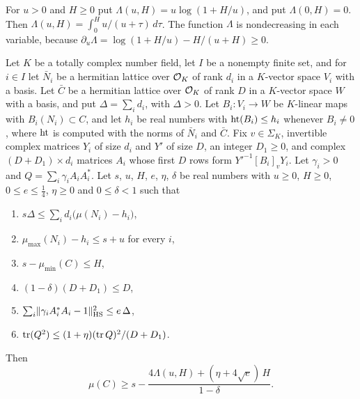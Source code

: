 For $u>0$ and $H\ge0$ put $\Lambda(u,H)=u\log(1+H/u)$, and put $\Lambda(0,H)=0$. Then $\Lambda(u,H)=\int_0^Hu/(u+\tau)\,d\tau$. The function $\Lambda$ is nondecreasing in each variable, because $\partial_u\Lambda=\log(1+H/u)-H/(u+H)\ge0$.

\begin{theorem}\label{r3:frame}
Let $K$ be a totally complex number field, let $I$ be a nonempty finite set, and for $i\in I$ let $\bar N_i$ be a hermitian lattice over $\mathcal O_K$ of rank $d_i$ in a $K$-vector space $V_i$ with a basis. Let $\bar C$ be a hermitian lattice over $\mathcal O_K$ of rank $D$ in a $K$-vector space $W$ with a basis, and put $\Delta=\sum_id_i$, with $\Delta>0$. Let $B_i\colon V_i\to W$ be $K$-linear maps with $B_i(N_i)\subset C$, and let $h_i$ be real numbers with $\operatorname{ht}(B_i)\le h_i$ whenever $B_i\ne0$, where $\operatorname{ht}$ is computed with the norms of $\bar N_i$ and $\bar C$. Fix $v\in\Sigma_K$, invertible complex matrices $Y_i$ of size $d_i$ and $Y'$ of size $D$, an integer $D_1\ge0$, and complex $(D+D_1)\times d_i$ matrices $A_i$ whose first $D$ rows form $Y'^{-1}[B_i]_vY_i$. Let $\gamma_i>0$ and $Q=\sum_i\gamma_iA_iA_i^*$. Let $s$, $u$, $H$, $e$, $\eta$, $\delta$ be real numbers with $u\ge0$, $H\ge0$, $0\le e\le\frac14$, $\eta\ge0$ and $0\le\delta<1$ such that
\begin{enumerate}
\item[(i)] $s\Delta\le\sum_id_i\big(\mu(N_i)-h_i\big)$,
\item[(ii)] $\mu_{\max}(N_i)-h_i\le s+u$ for every $i$,
\item[(iii)] $s-\mu_{\min}(C)\le H$,
\item[(iv)] $(1-\delta)(D+D_1)\le D$,
\item[(v)] $\sum_i\lVert\gamma_iA_i^*A_i-1\rVert_{\mathrm{HS}}^2\le e\,\Delta$,
\item[(vi)] $\operatorname{tr}(Q^2)\le(1+\eta)(\operatorname{tr} Q)^2/(D+D_1)$.
\end{enumerate}
Then
\[
\mu(C)\ge s-\frac{4\Lambda(u,H)+(\eta+4\sqrt e)\,H}{1-\delta}.
\]
\end{theorem}

